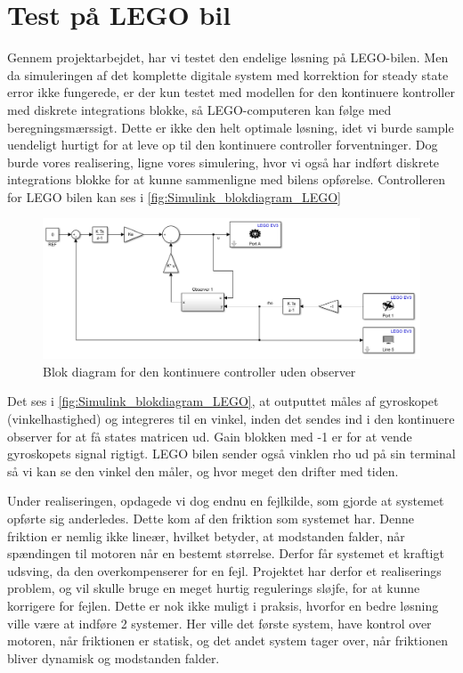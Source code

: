 \section{Test på LEGO bil}

Gennem projektarbejdet, har vi testet den endelige løsning på LEGO-bilen. Men da simuleringen af det komplette digitale system med korrektion for steady state error ikke fungerede, er der kun testet med modellen for den kontinuere kontroller  med diskrete integrations blokke, så LEGO-computeren kan følge med beregningsmærssigt. Dette er ikke den helt optimale løsning, idet vi burde sample uendeligt hurtigt for at leve op til den kontinuere controller forventninger. Dog burde vores realisering, ligne vores simulering, hvor vi også har indført diskrete integrations blokke for at kunne sammenligne med bilens opførelse. Controlleren for LEGO bilen kan ses i \autoref{fig:Simulink_blokdiagram_LEGO} 

\begin{figure}[H]
	\centering
	\includegraphics[width = 1\textwidth]{figur/Simulink_blokdiagram_LEGO}
	\caption{Blok diagram for den kontinuere controller uden observer}
	\label{fig:Simulink_blokdiagram_LEGO}
\end{figure}

Det ses i \autoref{fig:Simulink_blokdiagram_LEGO}, at outputtet måles af gyroskopet (vinkelhastighed) og integreres til en vinkel, inden det sendes ind i den kontinuere observer for at få states matricen ud. Gain blokken med -1 er for at vende gyroskopets signal rigtigt. LEGO bilen sender også vinklen rho ud på sin terminal så vi kan se den vinkel den måler, og hvor meget den drifter med tiden.

Under realiseringen, opdagede vi dog endnu en fejlkilde, som gjorde at systemet opførte sig anderledes. Dette kom af den friktion som systemet har. Denne friktion er nemlig ikke lineær, hvilket betyder, at modstanden falder, når spændingen til motoren når en bestemt størrelse. Derfor får systemet et kraftigt udsving, da den overkompenserer for en fejl. Projektet har derfor et realiserings problem, og vil skulle bruge en meget hurtig regulerings sløjfe, for at kunne korrigere for fejlen. Dette er nok ikke muligt i praksis, hvorfor en bedre løsning ville være at indføre 2 systemer. Her ville det første system, have kontrol over motoren, når friktionen er statisk, og det andet system tager over, når friktionen bliver dynamisk og modstanden falder.

